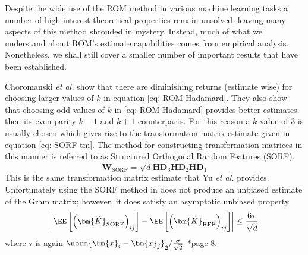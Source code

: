 Despite the wide use of the ROM method in various machine learning tasks \cite{ChoromanskiKrzysztof2017TUEo,AndoniAlexandr2015PaOL,ChoromanskiKrzysztof2020RAwP,LiuFanghui2021RFfK} a number of high-interest theoretical properties remain unsolved, leaving many aspects of this method shrouded in mystery. Instead, much of what we understand about ROM's estimate capabilities comes from empirical analysis. Nonetheless, we shall still cover a smaller number of important results that have been established.

Choromanski {\it et al.} \cite{ChoromanskiKrzysztof2017TUEo} show that there are diminishing returns (estimate wise) for choosing larger values of $k$ in equation \ref{eq: ROM-Hadamard}. They also show that choosing odd values of $k$ in \ref{eq: ROM-Hadamard} provides better estimates then its even-parity $k-1$ and $k+1$ counterparts. For this reason a $k$ value of $3$ is usually chosen which gives rise to the transformation matrix estimate given in equation \ref{eq: SORF-tm}. The method for constructing transformation matrices in this manner is referred to as Structured Orthogonal Random Features (SORF).
\begin{equation} \label{eq: SORF-tm}
    \bm{W}_{\text{SORF}} = \sqrt{d} \bm{H} \bm{D}_{3} \bm{H} \bm{D}_{2} \bm{H} \bm{D}_{1}
\end{equation}
This is the same transformation matrix estimate that Yu {\it et al.} provides. Unfortunately using the SORF method in  does not produce an unbiased estimate of the Gram matrix; however, it does satisfy an asymptotic unbiased property
\begin{equation*}
    \left| \EE \left[ \left( \bm{\widetilde{K}}_{\text{SORF}} \right)_{ij} \right] - \EE \left[ \left( \bm{\widetilde{K}}_{\text{RFF}} \right)_{ij} \right] \right| \leq \frac{6 \tau}{\sqrt{d}}
\end{equation*}
where $\tau$ is again $\norm{\bm{x}_i - \bm{x}_j}_2 / \frac{\sigma}{\sqrt{2}}$ \cite{LiuFanghui2021RFfK}*{page 8}.

